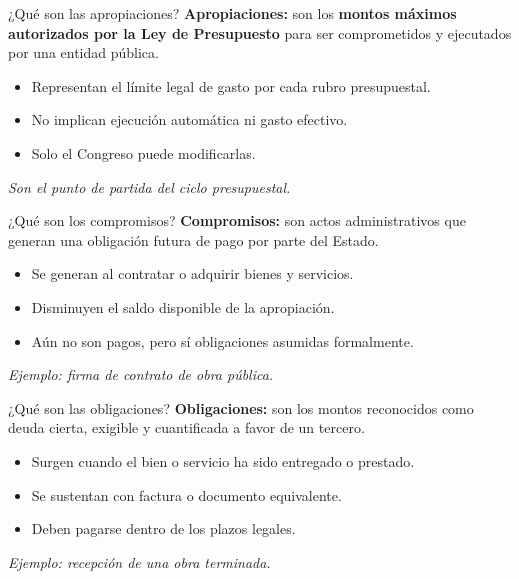 \begin{frame}{¿Qué son las apropiaciones?}
\textbf{Apropiaciones:} son los \textbf{montos máximos autorizados por la Ley de Presupuesto} para ser comprometidos y ejecutados por una entidad pública.

\vspace{1em}
\begin{itemize}
  \item Representan el límite legal de gasto por cada rubro presupuestal.
  \item No implican ejecución automática ni gasto efectivo.
  \item Solo el Congreso puede modificarlas.
\end{itemize}

\vspace{1em}
\textit{Son el punto de partida del ciclo presupuestal.}
\end{frame}

\begin{frame}{¿Qué son los compromisos?}
\textbf{Compromisos:} son actos administrativos que generan una obligación futura de pago por parte del Estado.

\vspace{1em}
\begin{itemize}
  \item Se generan al contratar o adquirir bienes y servicios.
  \item Disminuyen el saldo disponible de la apropiación.
  \item Aún no son pagos, pero sí obligaciones asumidas formalmente.
\end{itemize}

\vspace{1em}
\textit{Ejemplo: firma de contrato de obra pública.}
\end{frame}

\begin{frame}{¿Qué son las obligaciones?}
\textbf{Obligaciones:} son los montos reconocidos como deuda cierta, exigible y cuantificada a favor de un tercero.

\vspace{1em}
\begin{itemize}
  \item Surgen cuando el bien o servicio ha sido entregado o prestado.
  \item Se sustentan con factura o documento equivalente.
  \item Deben pagarse dentro de los plazos legales.
\end{itemize}

\vspace{1em}
\textit{Ejemplo: recepción de una obra terminada.}
\end{frame}

